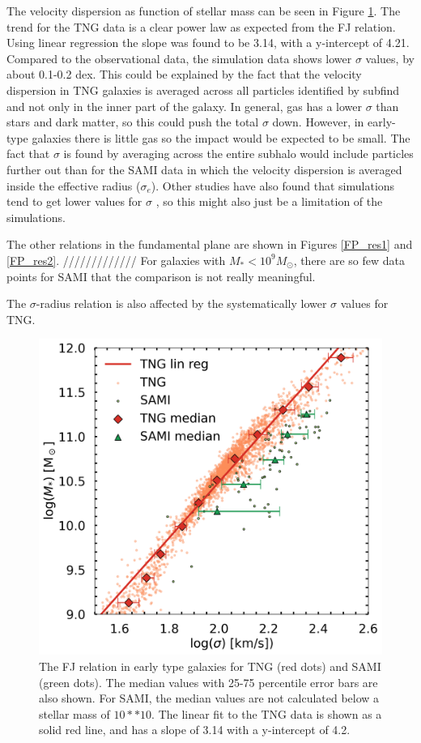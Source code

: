 The velocity dispersion as function of stellar mass can be seen in Figure \ref{FJ_res}. The trend for the TNG data is a clear power law as expected from the FJ relation. Using linear regression the slope was found to be 3.14, with a y-intercept of 4.21. Compared to the observational data, the simulation data shows lower $\sigma$ values, by about 0.1-0.2 dex. This could be explained by the fact that the velocity dispersion in TNG galaxies is averaged across all particles identified by subfind and not only in the inner part of the galaxy. In general, gas has a lower $\sigma$ than stars and dark matter, so this could push the total $\sigma$ down. However, in early-type galaxies there is little gas so the impact would be expected to be small. The fact that $\sigma$ is found by averaging across the entire subhalo would include particles further out than for the SAMI data in which the velocity dispersion is averaged inside the effective radius ($\sigma_{e}$). Other studies have also found that simulations tend to get lower values for $\sigma$ \parencite{Sande2018}, so this might also just be a limitation of the simulations.

The other relations in the fundamental plane are shown in Figures \ref{FP_res1} and \ref{FP_res2}. 
/////////////
For galaxies with $M_*<10^9 M_{\odot}$, there are so few data points for SAMI that the comparison is not really meaningful. 

The $\sigma$-radius relation is also affected by the systematically lower $\sigma$ values for TNG. 

\begin{figure}
    \centering
    \includegraphics[width=\textwidth]{images/results_faber_jackson.png}
    \caption{The FJ relation in early type galaxies for TNG (red dots) and SAMI (green dots). The median values with 25-75 percentile error bars are also shown. For SAMI, the median values are not calculated below a stellar mass of $10**10$. The linear fit to the TNG data is shown as a solid red line, and has a slope of 3.14 with a y-intercept of 4.2.}
    \label{FJ_res}
\end{figure}

